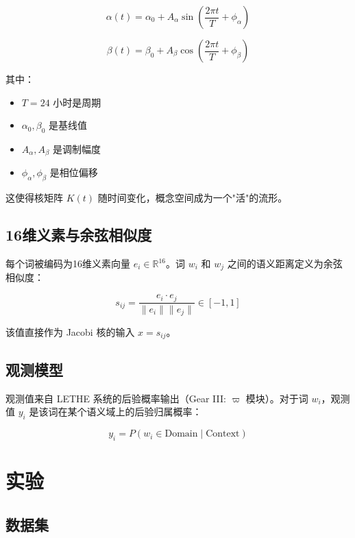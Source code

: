 \documentclass[12pt, a4paper]{article}
\begin{document}
\begin{equation}
\alpha(t) = \alpha_0 + A_\alpha \sin\left(\frac{2\pi t}{T} + \phi_\alpha\right)
\end{equation}

\begin{equation}
\beta(t) = \beta_0 + A_\beta \cos\left(\frac{2\pi t}{T} + \phi_\beta\right)
\end{equation}

其中：
\begin{itemize}
    \item $T = 24$ 小时是周期
    \item $\alpha_0, \beta_0$ 是基线值
    \item $A_\alpha, A_\beta$ 是调制幅度
    \item $\phi_\alpha, \phi_\beta$ 是相位偏移
\end{itemize}

这使得核矩阵 $K(t)$ 随时间变化，概念空间成为一个"活"的流形。

\subsection{16维义素与余弦相似度}

每个词被编码为16维义素向量 $e_i \in \mathbb{R}^{16}$。词 $w_i$ 和 $w_j$ 之间的语义距离定义为余弦相似度：

\begin{equation}
s_{ij} = \frac{e_i \cdot e_j}{\|e_i\| \|e_j\|} \in [-1, 1]
\end{equation}

该值直接作为 Jacobi 核的输入 $x = s_{ij}$。

\subsection{观测模型}

观测值来自 LETHE 系统的后验概率输出（Gear III: $\varpi$ 模块）。对于词 $w_i$，观测值 $y_i$ 是该词在某个语义域上的后验归属概率：

\begin{equation}
y_i = P(w_i \in \text{Domain} \mid \text{Context})
\end{equation}

\section{实验}

\subsection{数据集}
\end{document}
